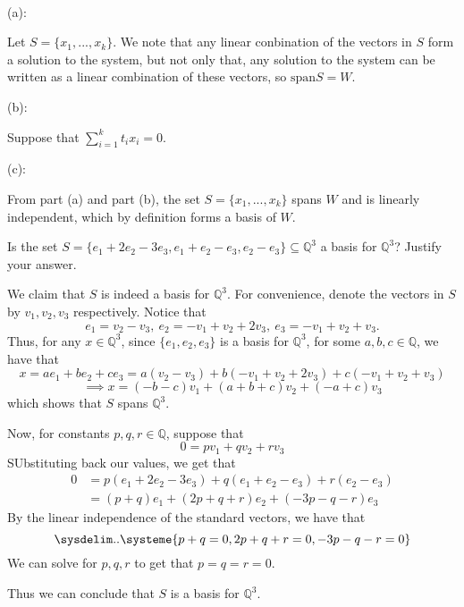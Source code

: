 \documentclass{article}
\theoremstyle{plain} %
\numberwithin{thm}{section} %
\theoremstyle{definition}
\begin{document}
\begin{question}{3}
        \tcblower
        \ 

        (a):

        Let \(S = \{ x_1, ..., x_k \}\). We note that any linear conbination of the vectors in \(S\) form a solution to the system, but not only that, any solution to the system can be written as a linear combination of these vectors, so \(\mathrm{span} S = W\).

        \medskip

        (b):

        Suppose that \(\sum_{i=1}^{k} t_i x_i = 0\).

        \medskip

        (c):

        From part (a) and part (b), the set \(S = \{ x_1, ..., x_k \}\) spans \(W\) and is linearly independent, which by definition forms a basis of \(W\).
    \end{question}
    \newpage
    \begin{question}{4}
        Is the set \( S = \{e_1 + 2 e_2 - 3 e_3, e_1 + e_2 - e_3, e_2 - e_3\} \subseteq \mathbb{Q}^3 \) a basis for \( \mathbb{Q}^3 \)? Justify your answer.

        \tcblower

        We claim that \(S\) is indeed a basis for \(\mathbb{Q}^3\). For convenience, denote the vectors in \(S\) by \(v_1, v_2, v_3\) respectively. Notice that
        \[
            e_1 = v_2 - v_3,\ e_2 = -v_1 + v_2 + 2v_3,\ e_3 = -v_1 + v_2 + v_3.
        \]
        Thus, for any \(x \in \mathbb{Q}^3\), since \(\{ e_1, e_2, e_3 \}\) is a basis for \(\mathbb{Q}^3\), for some \(a,b,c \in \mathbb{Q}\), we have that
        \[
            x = ae_1 + be_2 + ce_3 = a(v_2 - v_3) + b(-v_1 + v_2 + 2v_3) + c(-v_1 + v_2 + v_3)
        \]
        \[
            \implies x = (-b - c)v_1 + (a + b + c)v_2 + (-a + c)v_3
        \]
        which shows that \(S\) spans \(\mathbb{Q}^3\).

        Now, for constants \(p,q,r \in \mathbb{Q}\), suppose that
        \[
            0 = pv_1 + qv_2 + rv_3
        \]
        SUbstituting back our values, we get that
        \begin{align*}
            0 &= p(e_1 + 2e_2 - 3e_3) + q(e_1 + e_2 - e_3) + r(e_2 - e_3) \\
            &= (p + q)e_1 + (2p + q + r)e_2 + (-3p -q -r)e_3
        \end{align*}
        By the linear independence of the standard vectors, we have that
        \begin{equation*}
            \sysdelim..
            \systeme{
                p+q = 0,
                2p + q + r = 0,
                -3p -q - r = 0
            }
        \end{equation*}
        We can solve for \(p,q,r\) to get that \(p = q = r = 0\).

        Thus we can conclude that \(S\) is a basis for \(\mathbb{Q}^3\).
    \end{question}
\end{document}
